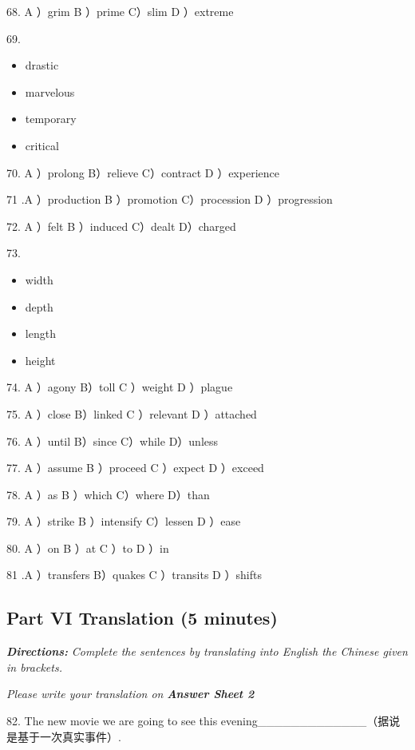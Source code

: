 \documentclass[UTF8,11pt]{ctexart}
\begin{document}
68. A ）grim B ）prime C）slim D ）extreme


69.


\begin{itemize}[leftmargin=2em,itemsep=.2em,topsep=.4em]\item[A.] drastic
\item[B.] marvelous
\item[C.] temporary
\item[D.] critical
\end{itemize}

70. A ）prolong B）relieve C）contract D ）experience


71 .A ）production B ）promotion C）procession D ）progression


72. A ）felt B ）induced C）dealt D）charged


73.


\begin{itemize}[leftmargin=2em,itemsep=.2em,topsep=.4em]\item[A.] width
\item[B.] depth
\item[C.] length
\item[D.] height
\end{itemize}

74. A ）agony B）toll C ）weight D ）plague


75. A ）close B）linked C ）relevant D ）attached


76. A ）until B）since C）while D）unless


77. A ）assume B ）proceed C ）expect D ）exceed


78. A ）as B ）which C）where D）than


79. A ）strike B ）intensify C）lessen D ）ease


80. A ）on B ）at C ）to D ）in


81 .A ）transfers B）quakes C ）transits D ）shifts


\subsection*{\textbf{Part VI} \textbf{Translation (5 minutes)}}


\textbf{\textit{Directions:}}\textit{ Complete the sentences by translating into English the Chinese given in brackets.}


\textit{Please write your translation on}\textbf{\textit{ Answer Sheet 2}}


82. The new movie we are going to see this evening\_\_\_\_\_\_\_\_\_\_\_\_\_（据说是基于一次真实事件）.
\end{document}
